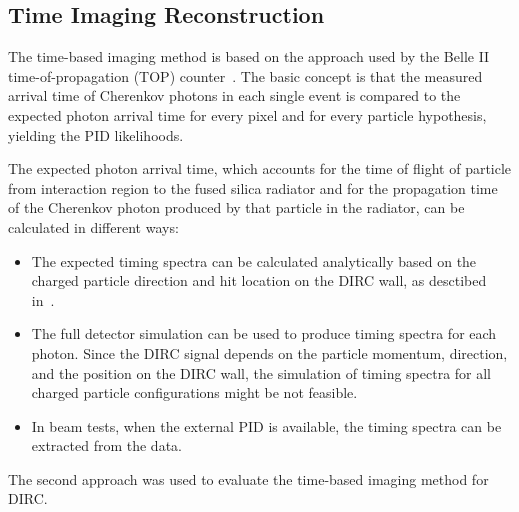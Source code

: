 \subsection{Time Imaging Reconstruction}
\label{sec:ti}

The time-based imaging method is based on the approach used by the Belle II time-of-propagation (TOP) counter~\cite{staric2}. The basic concept is that the measured arrival time of Cherenkov photons in each single event is compared to the expected photon arrival time for every pixel and for every particle hypothesis, yielding the PID likelihoods.

The expected photon arrival time, which accounts for the time of flight of particle from interaction region to the fused silica radiator and for the propagation time of the Cherenkov photon produced by that particle in the radiator, can be calculated in different ways:
\begin{itemize}
\item The expected timing spectra can be calculated analytically based on the charged particle direction and hit location on the DIRC wall, as desctibed in~\cite{staric2, staric3}.
\item The full detector simulation can be used to produce timing spectra for each photon. Since the DIRC signal depends on the particle momentum, direction, and the position on the DIRC wall, the simulation of timing spectra for all charged particle configurations might be not feasible.
\item In beam tests, when the external PID is available, the timing spectra can be extracted from the data.
\end{itemize}

The second approach was used to evaluate the time-based imaging method for \gluex DIRC.

